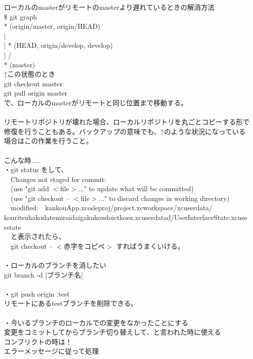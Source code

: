\documentclass[openany,11pt,papersize]{jsbook}
\begin{document}
\begin{appendix}
ローカルのmasterがリモートのmasterより遅れているときの解消方法 \\
\$ git graph \\
* (origin/master, origin/HEAD) \\
| \ \\
|  * (HEAD, origin/develop, develop) \\
| / \\
* (master) \\
↑この状態のとき \\
git checkout master \\
git pull origin master \\
で、ローカルのmasterがリモートと同じ位置まで移動する。 \\ \\
リモートリポジトリが壊れた場合、ローカルリポジトリを丸ごとコピーする形で修復を行うこともある。バックアップの意味でも、↑のような状況になっている場合はこの作業を行うこと。 \\ \\
こんな時..... \\
・git status をして、 \\
　Changes not staged for commit: \\
  　(use "git add $<$file$>$..." to update what will be committed) \\
  　(use "git checkout -- $<$file$>$..." to discard changes in working directory) \\
　modified:　kankouApp.xcodeproj/project.xcworkspace/xcuserdata/ \\
\hspace{0.5cm} kouritsuhakodatemiraidaigakukoudoictkosu.xcuserdatad/UserInterfaceState.xcuserstate \\
　と表示されたら、 \\
　git checkout -- $<$赤字をコピペ$>$ すればうまくいける。 \\ \\
・ローカルのブランチを消したい \\
	git branch -d [ブランチ名] \\ \\
・git push origin :test \\
リモートにあるtestブランチを削除できる。 \\ \\
・今いるブランチのローカルでの変更をなかったことにする \\
変更をコミットしてからブランチ切り替えして、と言われた時に使える \\
コンフリクトの時は！ \\
エラーメッセージに従って処理  \\


\end{appendix}
\end{document}

